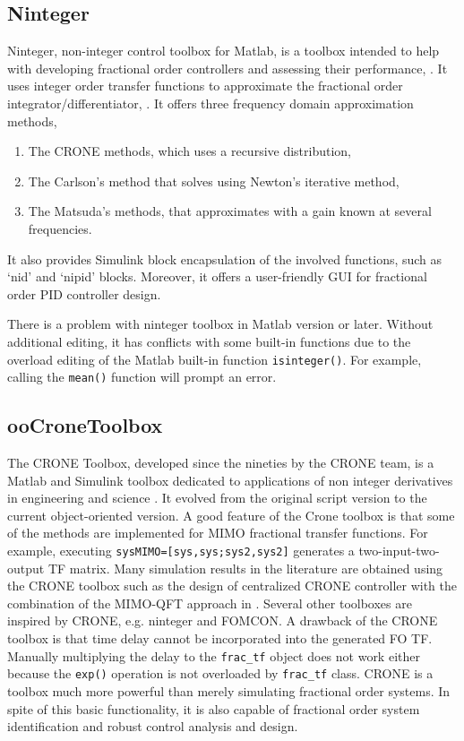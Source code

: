 \documentclass[11pt]{tCON2e}
\theoremstyle{plain}\newtheorem{theorem}{Theorem}
\theoremstyle{definition}
\theoremstyle{remark}
\begin{document}
\subsection{Ninteger}
Ninteger, non-integer control toolbox for Matlab, is a toolbox intended to help with developing fractional order controllers and assessing their performance, \cite{ref:Duarte3}. It uses integer order transfer functions to approximate the fractional order integrator/differentiator, . It offers three frequency domain approximation methods,
\begin{enumerate}
    \item The CRONE methods, which uses a recursive distribution,
    
    \item The Carlson's method that solves  using Newton's iterative method,
    
    \item The Matsuda's methods, that approximates  with a gain known at several frequencies.
    
\end{enumerate}
It also provides Simulink block encapsulation of the involved functions, such as `nid' and `nipid' blocks. Moreover, it offers a user-friendly GUI for fractional order PID controller design.

There is a problem with ninteger toolbox in Matlab version  or later. Without additional editing, it has conflicts with some built-in functions due to the overload editing of the Matlab built-in function {\tt isinteger()}. For example, calling the {\tt mean()} function will prompt an error.



\subsection{ooCroneToolbox}
The CRONE Toolbox, developed since the nineties by the CRONE team, is a Matlab and Simulink toolbox dedicated to applications of non integer derivatives in engineering and science \cite{ref:CRONE1}. It evolved from the original script version to the current object-oriented version. A good feature of the Crone toolbox is that some of the methods are implemented for MIMO fractional transfer functions. For example, executing {\tt sysMIMO=[sys,sys;sys2,sys2]} generates a two-input-two-output TF matrix. Many simulation results in the literature are obtained using the CRONE toolbox such as the design of centralized CRONE controller with the combination of the MIMO-QFT approach in \cite{ref:Oustaloup_MIMO}. Several other toolboxes are inspired by CRONE, e.g. ninteger and FOMCON.
A drawback of the CRONE toolbox is that time delay cannot be incorporated into the generated FO TF. Manually multiplying the delay to the {\tt frac\_tf} object does not work either because the {\tt exp()} operation is not overloaded by {\tt frac\_tf} class. CRONE is a toolbox much more powerful than merely simulating fractional order systems. In spite of this basic functionality, it is also capable of fractional order system identification and robust control analysis and design.
\end{document}
